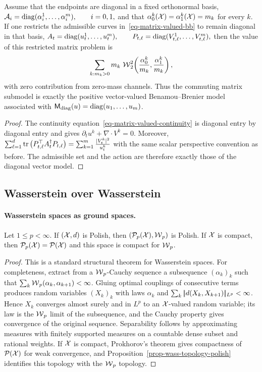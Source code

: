 \begin{prop}\label{prop-matrix-diagonal-reduction}
Assume that the endpoints are diagonal in a fixed orthonormal basis, \(\mathcal A_i=\operatorname{diag}(\alpha_i^1,\ldots,\alpha_i^m), \qquad i=0,1,\)
and that $\alpha_0^k(\mathcal{X})=\alpha_1^k(\mathcal{X})=m_k$ for every $k$. If one restricts the admissible curves in~\eqref{eq-matrix-valued-bb} to remain diagonal in that basis,
\(A_t=\operatorname{diag}(u_t^1,\ldots,u_t^m), \qquad P_{t,\ell}=\operatorname{diag}(V_{t,\ell}^1,\ldots,V_{t,\ell}^m),\)
then the value of this restricted matrix problem is
\[
\sum_{k:m_k>0} m_k\,\operatorname{\mathcal{W}}_2^2\!\left(\frac{\alpha_0^k}{m_k},\frac{\alpha_1^k}{m_k}\right),
\]
with zero contribution from zero-mass channels. Thus the commuting matrix submodel is exactly the positive vector-valued Benamou--Brenier model associated with $\mathsf M_{\mathrm{diag}}(u)=\operatorname{diag}(u_1,\ldots,u_m)$.
\end{prop}
\begin{proof}
The continuity equation~\eqref{eq-matrix-valued-continuity} is diagonal entry by diagonal entry and gives $\partial_t u^k+\nabla\cdot V^k=0$. Moreover,
\(\sum_{\ell=1}^d \operatorname{tr}\big(P_{t,\ell}^{\top}A_t^\dagger P_{t,\ell}\big) = \sum_{k=1}^m \frac{|V_t^k|^2}{u_t^k}\)
with the same scalar perspective convention as before. The admissible set and the action are therefore exactly those of the diagonal vector model.
\end{proof}
\subsection{Wasserstein over Wasserstein}
\label{sec-wasserstein-over-wasserstein}
\paragraph{Wasserstein spaces as ground spaces.}
\begin{prop}\label{prop-wasserstein-space-polish}
Let $1\leq p<\infty$. If $(\mathcal{X},d)$ is Polish, then $(\mathcal{P}_p(\mathcal{X}),\operatorname{\mathcal{W}}_p)$ is Polish. If $\mathcal{X}$ is compact, then $\mathcal{P}_p(\mathcal{X})=\mathcal{P}(\mathcal{X})$ and this space is compact for $\operatorname{\mathcal{W}}_p$.
\end{prop}
\begin{proof}
This is a standard structural theorem for Wasserstein spaces. For completeness, extract from a $\operatorname{\mathcal{W}}_p$-Cauchy sequence a subsequence $(\alpha_k)_k$ such that $\sum_k\operatorname{\mathcal{W}}_p(\alpha_k,\alpha_{k+1})<\infty$. Gluing optimal couplings of consecutive terms produces random variables $(X_k)_k$ with laws $\alpha_k$ and $\sum_k|\!| d(X_k,X_{k+1}) |\!|_{L^p}<\infty$. Hence $X_k$ converges almost surely and in $L^p$ to an $\mathcal{X}$-valued random variable; its law is the $\operatorname{\mathcal{W}}_p$ limit of the subsequence, and the Cauchy property gives convergence of the original sequence. Separability follows by approximating measures with finitely supported measures on a countable dense subset and rational weights. If $\mathcal{X}$ is compact, Prokhorov's theorem gives compactness of $\mathcal{P}(\mathcal{X})$ for weak convergence, and Proposition~\ref{prop-wass-topology-polish} identifies this topology with the $\operatorname{\mathcal{W}}_p$ topology.
\end{proof}
